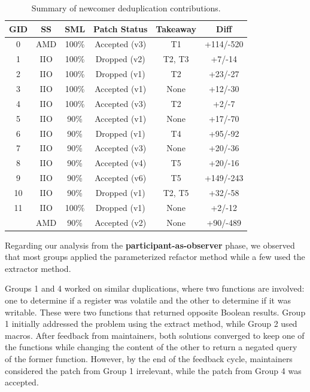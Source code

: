 \documentclass[sigconf]{acmart}
\begin{document}
\begin{table}[ht]
\centering
\caption{Summary of newcomer deduplication contributions.}
\begin{tabular}{ |c |c |c |c |c | c| }
\hline
\textbf{GID} & \textbf{SS} & \textbf{SML} & \textbf{Patch Status} & \textbf{Takeaway} & \textbf{Diff} \\
\hline
0 & AMD & 100\% & Accepted (v3) & T1 & +114/-520 \\ \hline
1 & IIO & 100\% & Dropped (v2) & T2, T3 & +7/-14 \\ \hline
2 & IIO & 100\% & Dropped (v1) & T2 & +23/-27 \\ \hline
3 & IIO & 100\% & Accepted (v1) & None & +12/-30 \\ \hline
4 & IIO & 100\% & Accepted (v3) & T2 & +2/-7 \\ \hline
5 & IIO & 90\% & Accepted (v1) & None & +17/-70 \\ \hline
6 & IIO & 90\% & Dropped (v1) & T4 & +95/-92 \\ \hline
7 & IIO & 90\% & Accepted (v3) & None & +20/-36 \\ \hline
8 & IIO & 90\% & Accepted (v4) & T5 & +20/-16 \\ \hline
9 & IIO & 90\% & Accepted (v6) & T5 & +149/-243 \\ \hline
10 & IIO & 90\% & Dropped (v1) & T2, T5 & +32/-58 \\ \hline
11 & IIO & 100\% & Dropped (v1) & None & +2/-12 \\
   & AMD & 90\% & Accepted (v2) & None & +90/-489 \\ \hline

\end{tabular}%

\label{tab:stu}
\end{table}

Regarding our analysis from the \textbf{participant-as-observer} phase, we observed that most groups applied the parameterized refactor method while a few used the extractor method.

Groups 1 and 4 worked on similar duplications, where two functions are involved: one to determine if a register was volatile and the other to determine if it was writable. These were two functions that returned opposite Boolean results. Group 1 initially addressed the problem using the extract method, while Group 2 used macros. After feedback from maintainers, both solutions converged to keep one of the functions while changing the content of the other to return a negated query of the former function. However, by the end of the feedback cycle, maintainers considered the patch from Group 1 irrelevant, while the patch from Group 4 was accepted.
\end{document}
